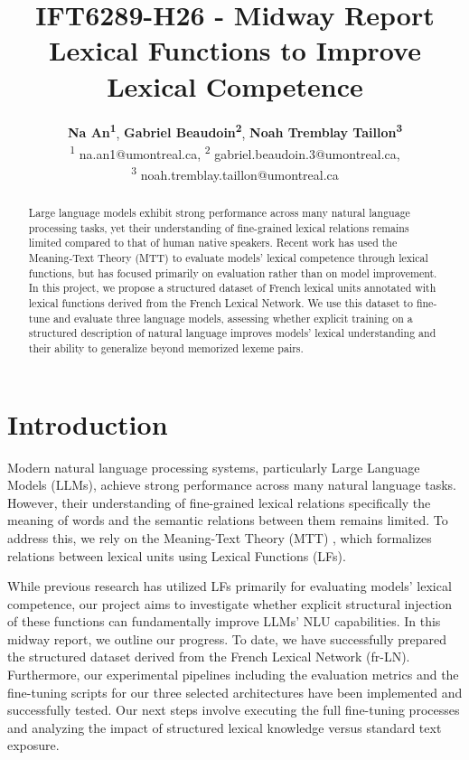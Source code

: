 \documentclass[11pt]{article}
\title{IFT6289-H26 - Midway Report\\ Lexical Functions to Improve Lexical
  Competence}
\author{
    \textbf{Na An\textsuperscript{1}},
    \textbf{Gabriel Beaudoin\textsuperscript{2}},
    \textbf{Noah Tremblay Taillon\textsuperscript{3}}
    \\
    \textsuperscript{1} na.an1@umontreal.ca,
    \textsuperscript{2} gabriel.beaudoin.3@umontreal.ca,\\
    \textsuperscript{3} noah.tremblay.taillon@umontreal.ca
    }
\begin{document}
\maketitle
\begin{abstract}
Large language models exhibit strong performance across many natural language
processing tasks, yet their understanding of fine-grained lexical relations
remains limited compared to that of human native speakers. Recent work has used 
the Meaning-Text Theory (MTT) to evaluate models' lexical competence through
lexical functions, but has focused primarily on evaluation rather than
on model improvement. In this project, we propose a structured dataset of French
lexical units annotated with lexical functions derived from the French Lexical
Network. We use this dataset to fine-tune and evaluate three language models,
assessing whether explicit training on a structured description of natural
language improves models' lexical understanding and their ability to generalize
beyond memorized lexeme pairs.
\end{abstract}

\section{Introduction}
Modern natural language processing systems, particularly Large Language Models (LLMs), achieve strong performance across many natural language tasks. However, their understanding of fine-grained lexical relations specifically the meaning of words and the semantic relations between them remains limited. To address this, we rely on the Meaning-Text Theory (MTT) \cite{melcukVersLinguistiqueSensTexte1997}, which formalizes relations between lexical units using Lexical Functions (LFs). 

While previous research has utilized LFs primarily for evaluating models' lexical competence, our project aims to investigate whether explicit structural injection of these functions can fundamentally improve LLMs' NLU capabilities. In this midway report, we outline our progress. To date, we have successfully prepared the structured dataset derived from the French Lexical Network (fr-LN). Furthermore, our experimental pipelines including the evaluation metrics and the fine-tuning scripts for our three selected architectures have been implemented and successfully tested. Our next steps involve executing the full fine-tuning processes and analyzing the impact of structured lexical knowledge versus standard text exposure.
\end{document}
